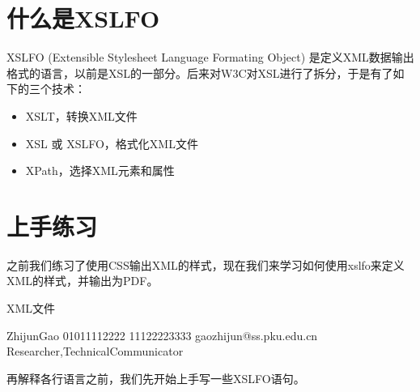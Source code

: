 \documentclass[letterpaper,10pt,english]{sphinxmanual}
\begin{document}
\section{什么是XSL\sphinxhyphen{}FO}
\label{\detokenize{formatting/XSL-FO:id1}}
\sphinxAtStartPar
XSL\sphinxhyphen{}FO  (Extensible Stylesheet Language Formating Object) 是定义XML数据输出格式的语言，以前是XSL的一部分。后来对W3C对XSL进行了拆分，于是有了如下的三个技术：
\begin{itemize}
\item {} 
\sphinxAtStartPar
XSLT，转换XML文件

\item {} 
\sphinxAtStartPar
XSL 或 XSL\sphinxhyphen{}FO，格式化XML文件

\item {} 
\sphinxAtStartPar
XPath，选择XML元素和属性

\end{itemize}


\section{上手练习}
\label{\detokenize{formatting/XSL-FO:id2}}
\sphinxAtStartPar
之前我们练习了使用CSS输出XML的样式，现在我们来学习如何使用xsl\sphinxhyphen{}fo来定义XML的样式，并输出为PDF。

\sphinxAtStartPar
XML文件

\begin{sphinxVerbatim}[commandchars=\\\{\}]

ZhijunGao
010\PYGZhy{}11112222
11122223333
gaozhijun@ss.pku.edu.cn
Researcher,TechnicalCommunicator
\end{sphinxVerbatim}

\sphinxAtStartPar
再解释各行语言之前，我们先开始上手写一些XSL\sphinxhyphen{}FO语句。
\end{document}
